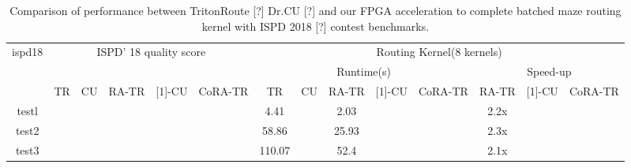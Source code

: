 \documentclass[conference]{IEEEtran}
\begin{document}
\begin{table}[!htbp]
    \caption{Comparison of performance between TritonRoute [?] Dr.CU [?] and our FPGA acceleration to complete batched maze routing kernel with ISPD 2018 [?] contest benchmarks.}
    \begin{tabular}{|c|llllc|cccllcll|}
    \hline
    \multirow{2}{*}{ispd18} & \multicolumn{5}{c|}{\multirow{2}{*}{ISPD' 18 quality score}}                                                               & \multicolumn{8}{c|}{Routing Kernel(8 kernels)}                                                                                                                                                                                                      \\ \cline{7-14} 
                            & \multicolumn{5}{c|}{}                                                                                                      & \multicolumn{5}{c|}{Runtime(s)}                                                                                                                       & \multicolumn{3}{c|}{Speed-up}                                                               \\ \hline
                            & \multicolumn{1}{c|}{TR} & \multicolumn{1}{c|}{CU} & \multicolumn{1}{c|}{RA-TR} & \multicolumn{1}{l|}{{[}1{]}-CU} & CoRA-TR & \multicolumn{1}{c|}{TR}     & \multicolumn{1}{c|}{CU} & \multicolumn{1}{c|}{RA-TR}   & \multicolumn{1}{l|}{{[}1{]}-CU} & \multicolumn{1}{c|}{CoRA-TR} & \multicolumn{1}{c|}{RA-TR} & \multicolumn{1}{l|}{{[}1{]}-CU} & \multicolumn{1}{c|}{CoRA-TR} \\ \hline
    testl                   & \multicolumn{1}{l|}{}   & \multicolumn{1}{l|}{}   & \multicolumn{1}{l|}{}      & \multicolumn{1}{l|}{}           &         & \multicolumn{1}{c|}{4.41}   & \multicolumn{1}{c|}{}   & \multicolumn{1}{c|}{2.03}    & \multicolumn{1}{l|}{}           & \multicolumn{1}{l|}{}        & \multicolumn{1}{c|}{2.2x}  & \multicolumn{1}{l|}{}           &                              \\ \hline
    test2                   & \multicolumn{1}{l|}{}   & \multicolumn{1}{l|}{}   & \multicolumn{1}{l|}{}      & \multicolumn{1}{l|}{}           &         & \multicolumn{1}{c|}{58.86}  & \multicolumn{1}{c|}{}   & \multicolumn{1}{c|}{25.93}   & \multicolumn{1}{l|}{}           & \multicolumn{1}{l|}{}        & \multicolumn{1}{c|}{2.3x}  & \multicolumn{1}{l|}{}           &                              \\ \hline
    test3                   & \multicolumn{1}{l|}{}   & \multicolumn{1}{l|}{}   & \multicolumn{1}{l|}{}      & \multicolumn{1}{l|}{}           &         & \multicolumn{1}{c|}{110.07} & \multicolumn{1}{c|}{}   & \multicolumn{1}{c|}{52.4}    & \multicolumn{1}{l|}{}           & \multicolumn{1}{l|}{}        & \multicolumn{1}{c|}{2.1x}  & \multicolumn{1}{l|}{}           &                              \\ \hline

\end{tabular}
\end{table}
\end{document}
